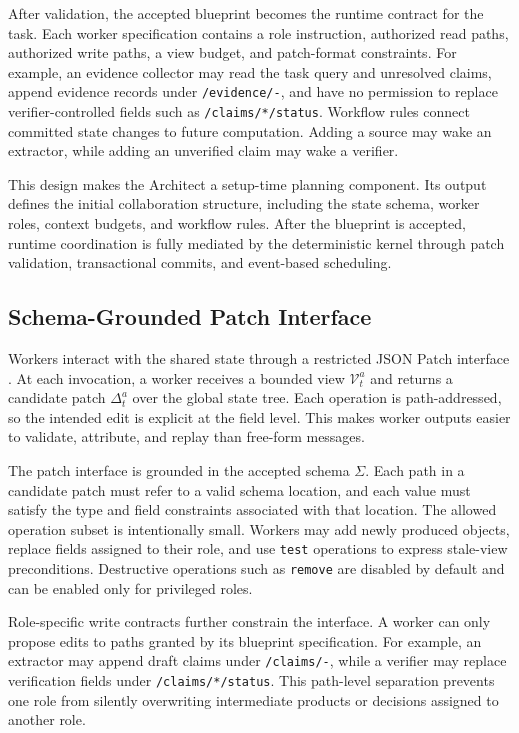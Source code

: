 \documentclass[11pt]{article}
\newcommand{\schema}{\Sigma}
\newcommand{\patch}{\Delta}
\newcommand{\view}{\mathcal{V}}
\begin{document}
After validation, the accepted blueprint becomes the runtime contract for the task. Each worker specification contains a role instruction, authorized read paths, authorized write paths, a view budget, and patch-format constraints. For example, an evidence collector may read the task query and unresolved claims, append evidence records under \texttt{/evidence/-}, and have no permission to replace verifier-controlled fields such as \texttt{/claims/*/status}. Workflow rules connect committed state changes to future computation. Adding a source may wake an extractor, while adding an unverified claim may wake a verifier.

This design makes the Architect a setup-time planning component. Its output defines the initial collaboration structure, including the state schema, worker roles, context budgets, and workflow rules. After the blueprint is accepted, runtime coordination is fully mediated by the deterministic kernel through patch validation, transactional commits, and event-based scheduling.

\subsection{Schema-Grounded Patch Interface}
\label{sec:patch-interface}

Workers interact with the shared state through a restricted JSON Patch interface \citep{bryan2013rfc}. At each invocation, a worker receives a bounded view $\view_t^a$ and returns a candidate patch $\patch_t^a$ over the global state tree. Each operation is path-addressed, so the intended edit is explicit at the field level. This makes worker outputs easier to validate, attribute, and replay than free-form messages.

The patch interface is grounded in the accepted schema $\schema$. Each path in a candidate patch must refer to a valid schema location, and each value must satisfy the type and field constraints associated with that location. The allowed operation subset is intentionally small. Workers may add newly produced objects, replace fields assigned to their role, and use \texttt{test} operations to express stale-view preconditions. Destructive operations such as \texttt{remove} are disabled by default and can be enabled only for privileged roles.

Role-specific write contracts further constrain the interface. A worker can only propose edits to paths granted by its blueprint specification. For example, an extractor may append draft claims under \texttt{/claims/-}, while a verifier may replace verification fields under \texttt{/claims/*/status}. This path-level separation prevents one role from silently overwriting intermediate products or decisions assigned to another role.
\end{document}
